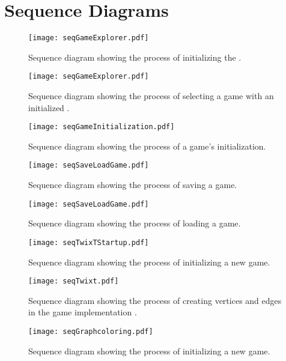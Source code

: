 \section{Sequence Diagrams}

\begin{figure}[h]
	\centering
	\texttt{[image: seqGameExplorer.pdf]}
	\caption{Sequence diagram showing the process of initializing the \gameexplorer.}
	\label{img:seqGameExplorer}
\end{figure}

\begin{figure}[h]
	\centering
	\texttt{[image: seqGameExplorer.pdf]}
	\caption{Sequence diagram showing the process of selecting a game with an initialized \gameexplorer.}
	\label{img:seqGameExplorer}
\end{figure}

\begin{figure}[h]
	\centering
	\texttt{[image: seqGameInitialization.pdf]}
	\caption{Sequence diagram showing the process of a game's initialization.}
	\label{img:seqGameInitialization}
\end{figure}

\begin{figure}[h]
	\centering
	\texttt{[image: seqSaveLoadGame.pdf]}
	\caption{Sequence diagram showing the process of saving a game.}
	\label{img:seqSaveLoadGame}
\end{figure}

\begin{figure}[h]
	\centering
	\texttt{[image: seqSaveLoadGame.pdf]}
	\caption{Sequence diagram showing the process of loading a game.}
	\label{img:seqSaveLoadGame}
\end{figure}

\begin{figure}[h]
	\centering
	\texttt{[image: seqTwixTStartup.pdf]}
	\caption{Sequence diagram showing the process of initializing a new \twixt game.}
	\label{img:seqTwixTStartup}
\end{figure}

\begin{figure}[h]
	\centering
	\texttt{[image: seqTwixt.pdf]}
	\caption{Sequence diagram showing the process of creating vertices and edges in the game implementation \twixt.}
	\label{img:seqTwixt}
\end{figure}

\begin{figure}[h]
	\centering
	\texttt{[image: seqGraphcoloring.pdf]}
	\caption{Sequence diagram showing the process of initializing a new \graphcoloring game.}
	\label{img:seqGraphcoloring}
\end{figure}
